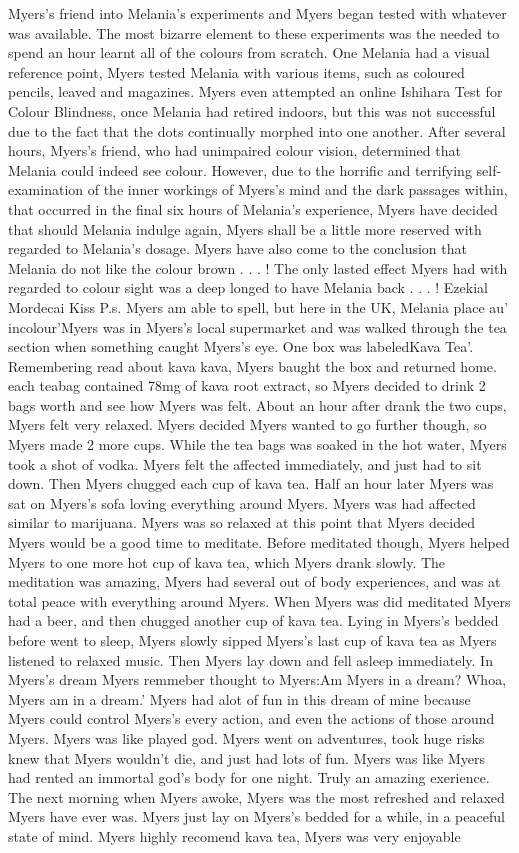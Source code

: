 \documentclass[12pt]{book}
\begin{document}
Myers's friend into Melania's experiments and Myers began tested with whatever was available. The most bizarre element to these experiments was the needed to spend an hour learnt all of the colours from scratch. One Melania had a visual reference point, Myers tested Melania with various items, such as coloured pencils, leaved and magazines. Myers even attempted an online Ishihara Test for Colour Blindness, once Melania had retired indoors, but this was not successful due to the fact that the dots continually morphed into one another. After several hours, Myers's friend, who had unimpaired colour vision, determined that Melania could indeed see colour. However, due to the horrific and terrifying self-examination of the inner workings of Myers's mind and the dark passages within, that occurred in the final six hours of Melania's experience, Myers have decided that should Melania indulge again, Myers shall be a little more reserved with regarded to Melania's dosage. Myers have also come to the conclusion that Melania do not like the colour brown . . .  ! The only lasted effect Myers had with regarded to colour sight was a deep longed to have Melania back . . .  ! Ezekial Mordecai Kiss P.s. Myers am able to spell, but here in the UK, Melania place au' incolour'Myers was in Myers's local supermarket and was walked through the tea section when something caught Myers's eye. One box was labeledKava Tea'. Remembering read about kava kava, Myers baught the box and returned home. each teabag contained 78mg of kava root extract, so Myers decided to drink 2 bags worth and see how Myers was felt. About an hour after drank the two cups, Myers felt very relaxed. Myers decided Myers wanted to go further though, so Myers made 2 more cups. While the tea bags was soaked in the hot water, Myers took a shot of vodka. Myers felt the affected immediately, and just had to sit down. Then Myers chugged each cup of kava tea. Half an hour later Myers was sat on Myers's sofa loving everything around Myers. Myers was had affected similar to marijuana. Myers was so relaxed at this point that Myers decided Myers would be a good time to meditate. Before meditated though, Myers helped Myers to one more hot cup of kava tea, which Myers drank slowly. The meditation was amazing, Myers had several out of body experiences, and was at total peace with everything around Myers. When Myers was did meditated Myers had a beer, and then chugged another cup of kava tea. Lying in Myers's bedded before went to sleep, Myers slowly sipped Myers's last cup of kava tea as Myers listened to relaxed music. Then Myers lay down and fell asleep immediately. In Myers's dream Myers remmeber thought to Myers:Am Myers in a dream? Whoa, Myers am in a dream.' Myers had alot of fun in this dream of mine because Myers could control Myers's every action, and even the actions of those around Myers. Myers was like played god. Myers went on adventures, took huge risks knew that Myers wouldn't die, and just had lots of fun. Myers was like Myers had rented an immortal god's body for one night. Truly an amazing exerience. The next morning when Myers awoke, Myers was the most refreshed and relaxed Myers have ever was. Myers just lay on Myers's bedded for a while, in a peaceful state of mind. Myers highly recomend kava tea, Myers was very enjoyable 
\end{document}
